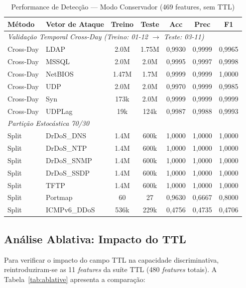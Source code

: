 \documentclass[12pt,a4paper]{article}
\begin{document}
\begin{center}
\footnotesize
\begin{longtable}{l l c c c c c}
\caption{Performance de Detec\c{c}\~{a}o --- Modo Conservador (469 features, sem TTL)} \\
\toprule
M\'{e}todo & Vetor de Ataque & Treino & Teste & Acc & Prec & F1 \\
\midrule
\multicolumn{7}{l}{\textit{Valida\c{c}\~{a}o Temporal Cross-Day (Treino: 01-12 $\rightarrow$ Teste: 03-11)}} \\
\midrule
Cross-Day & LDAP & 2.0M & 1.75M & 0,9930 & 0,9999 & 0,9965 \\
Cross-Day & MSSQL & 2.0M & 2.0M & 0,9995 & 0,9997 & 0,9998 \\
Cross-Day & NetBIOS & 1.47M & 1.7M & 0,9999 & 0,9999 & 1,0000 \\
Cross-Day & UDP & 2.0M & 2.0M & 0,9970 & 0,9999 & 0,9985 \\
Cross-Day & Syn & 173k & 2.0M & 0,9999 & 0,9999 & 0,9999 \\
Cross-Day & UDPLag & 19k & 124k & 0,9987 & 0,9988 & 0,9993 \\
\midrule
\multicolumn{7}{l}{\textit{Parti\c{c}\~{a}o Estoc\'{a}stica 70/30}} \\
\midrule
Split & DrDoS\_DNS & 1.4M & 600k & 1,0000 & 1,0000 & 1,0000 \\
Split & DrDoS\_NTP & 1.4M & 600k & 1,0000 & 1,0000 & 1,0000 \\
Split & DrDoS\_SNMP & 1.4M & 600k & 1,0000 & 1,0000 & 1,0000 \\
Split & DrDoS\_SSDP & 1.4M & 600k & 1,0000 & 1,0000 & 1,0000 \\
Split & TFTP & 1.4M & 600k & 1,0000 & 1,0000 & 1,0000 \\
Split & Portmap & 60 & 27 & 0,9630 & 0,6667 & 0,8000 \\
Split & ICMPv6\_DDoS & 536k & 229k & 0,4756 & 0,4735 & 0,4706 \\
\bottomrule
\end{longtable}
\end{center}

\subsection{An\'{a}lise Ablativa: Impacto do TTL}

Para verificar o impacto do campo TTL na capacidade discriminativa, reintroduziram-se as 11 \textit{features} da su\'{i}te TTL (480 \textit{features} totais). A Tabela~\ref{tab:ablative} apresenta a compara\c{c}\~{a}o:
\end{document}
